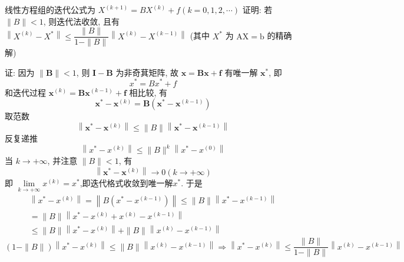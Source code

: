 \begin{tcolorbox}[breakable,
		colframe=white!10!jingga, coltitle=white!90!jingga, colback=white!95!jingga, coltext=black, colbacktitle=white!10!jingga, enhanced, fonttitle=\bfseries,fontupper=\normalsize, attach boxed title to top left={yshift=-2mm}, before skip=8pt, after skip=8pt,
		title=解答题]


线性方程组的迭代公式为 $ X^{(k+1)}=B X^{(k)}+f(k=0,1,2, \cdots) $
证明: 若 $ \|B\|<1 $, 则迭代法收敛, 且有
$ \left\|X^{(k)}-X^{*}\right\| \leqslant \dfrac{\|B\|}{1-\|B\|}\left\|X^{(k)}-X^{(k-1)}\right\| $ (其中 $ X^{*} $ 为 $ \mathrm{AX}=\mathrm{b} $ 的精确解)

\tcblower
证: 因为 $ \|\boldsymbol{B}\|<1 $, 则 $ \boldsymbol{I}-\boldsymbol{B} $ 为非奇萁矩阵, 故 $ \boldsymbol{x}=\boldsymbol{B} \boldsymbol{x}+\boldsymbol{f} $ 有唯一解 $ \boldsymbol{x}^{*} $, 即
$$
x^{*}=B x^{*}+f
$$
和迭代过程 $ \boldsymbol{x}^{(k)}=\boldsymbol{B} \boldsymbol{x}^{(k-1)}+\boldsymbol{f} $ 相比较, 有
$$
\boldsymbol{x}^{*}-\boldsymbol{x}^{(k)}=\boldsymbol{B}\left(\boldsymbol{x}^{*}-\boldsymbol{x}^{(k-1)}\right)
$$
取范数
$$
\left\|\boldsymbol{x}^{*}-\boldsymbol{x}^{(k)}\right\| \leqslant\|B\|\left\|\boldsymbol{x}^{*}-\boldsymbol{x}^{(k-1)}\right\|
$$
反复递推
$$
\left\|x^{*}-x^{(k)}\right\| \leqslant\|B\|^{k}\left\|x^{*}-x^{(0)}\right\|
$$
当 $ k \rightarrow+\infty $, 并注意 $ \|B\|<1 $, 有
$$
\left\|\boldsymbol{x}^{*}-\boldsymbol{x}^{(k)}\right\| \rightarrow 0(k \rightarrow+\infty)
$$
即 $ \lim\limits _{k \rightarrow+\infty} x^{(k)}=x^{*} $,即迭代格式收敛到唯一解$x^{*}$. 于是
$$
\begin{array}{c}
\left\|x^{*}-x^{(k)}\right\|=\left\|B\left(x^{*}-x^{(k-1)}\right)\right\| \leqslant\|B\|\left\|x^{*}-x^{(k-1)}\right\| \\
=\|B\|\left\|x^{*}-x^{(k)}+x^{(k)}-x^{(k-1)}\right\| \\
\leqslant\|B\|\left\|x^{*}-x^{(k)}\right\|+\|B\|\left\|x^{(k)}-x^{(k-1)}\right\|
\end{array}
$$
$$(1-\|B\|)\left\|x^{*}-x^{(k)}\right\| \leqslant\|B\|\left\|x^{(k)}-x^{(k-1)}\right\| \Rightarrow\left\|x^{*}-x^{(k)}\right\| \leqslant \frac{\|B\|}{1-\|B\|}\left\|x^{(k)}-x^{(k-1)}\right\|$$
\end{tcolorbox}

